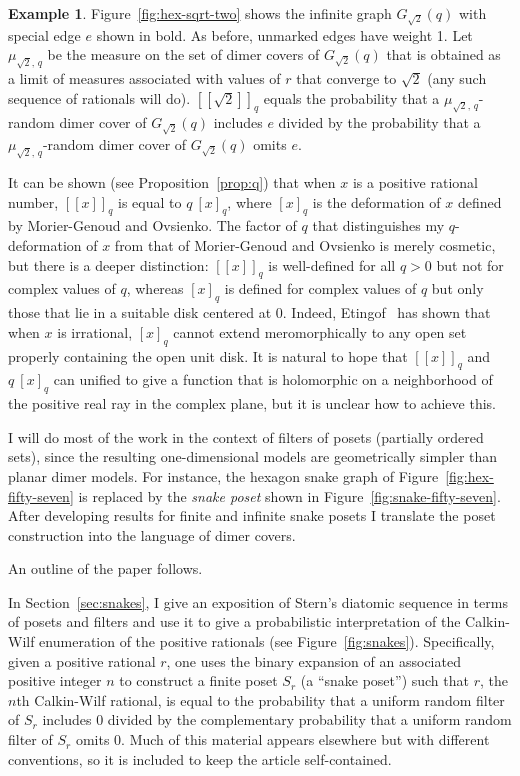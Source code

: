 \documentclass[12pt]{article}
\theoremstyle{plain}
\theoremstyle{definition}
\newtheorem{example}[theorem]{Example}
\theoremstyle{remark}
\newcommand{\llb}{[\![}
\newcommand{\rrb}{]\!]}
\begin{document}
\begin{example}
Figure~\ref{fig:hex-sqrt-two} shows the 
infinite graph $G_{\sqrt{2}}(q)$ with special edge $e$ shown in bold. 
As before, unmarked edges have weight 1.
Let $\mu_{\sqrt{2},\,q}$ be the measure on the set of dimer covers of 
$G_{\sqrt{2}}(q)$ that is obtained as a limit of measures associated with 
values of $r$ that converge to $\sqrt{2}$ (any such sequence of rationals 
will do).  $\llb \sqrt{2} \rrb_q$ equals 
the probability that a $\mu_{\sqrt{2},\,q}$-random dimer cover of 
$G_{\sqrt{2}}(q)$ includes $e$ divided by the probability that a 
$\mu_{\sqrt{2},\,q}$-random dimer cover of $G_{\sqrt{2}}(q)$ omits $e$. 
\end{example}

It can be shown (see Proposition~\ref{prop:q}) that 
when $x$ is a positive rational number, 
$\llb x \rrb_q$ is equal to $q \: [x]_q$,
where $[x]_q$ is the deformation of $x$ defined by Morier-Genoud and Ovsienko.
The factor of $q$ that distinguishes my $q$-deformation of $x$
from that of Morier-Genoud and Ovsienko
is merely cosmetic, but there is a deeper distinction: 
$\llb x \rrb_q$ is well-defined for all $q>0$ but not for
complex values of $q$, whereas $[x]_q$ is defined for complex values of
$q$ but only those that lie in a suitable disk centered at 0. Indeed,
Etingof~\cite{E25} has shown that when $x$ is irrational,
$[x]_q$ cannot extend meromorphically to 
any open set properly containing the open unit disk.
It is natural to hope that $\llb x \rrb_q$ and $q \: [x]_q$ can unified to give
a function that is holomorphic on a neighborhood of the positive real
ray in the complex plane, but it is unclear how to achieve this.

I will do most of the work in the context of filters of posets 
(partially ordered sets), since the resulting one-dimensional models 
are geometrically simpler than planar dimer models. For instance,
the hexagon snake graph of Figure~\ref{fig:hex-fifty-seven} is replaced 
by the {\em snake poset} shown in Figure~\ref{fig:snake-fifty-seven}.
After developing results for finite and infinite snake posets
I translate the poset construction into the language of dimer covers.

An outline of the paper follows.

In Section~\ref{sec:snakes}, I give an exposition
of Stern's diatomic sequence in terms of posets and filters
and use it to give a probabilistic interpretation
of the Calkin-Wilf enumeration of the positive rationals
(see Figure~\ref{fig:snakes}).
Specifically, given a positive rational $r$,
one uses the binary expansion of an associated positive integer $n$
to construct a finite poset $S_r$ (a ``snake poset'')
such that $r$, the $n$th Calkin-Wilf rational, 
is equal to the probability that a uniform random filter of $S_r$ includes 0 
divided by the complementary probability 
that a uniform random filter of $S_r$ omits 0. 
Much of this material appears elsewhere but with different conventions,
so it is included to keep the article self-contained.
\end{document}
